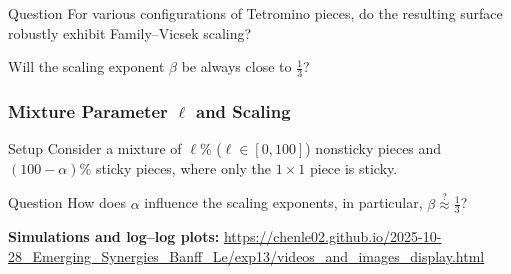 \documentclass[9pt,table,xcolor=dvipsnames]{beamer}
\begin{document}
\begin{frame}[fragile,t] %

  \begin{problock}{Question}
    For various configurations of Tetromino pieces, do the resulting surface
    robustly exhibit Family--Vicsek scaling?

    Will the scaling exponent $\beta$ be always close to $ \displaystyle \frac{1}{3}$?
  \end{problock}
  
\end{frame}
\begin{frame}[fragile] %
  \frametitle{Mixture Parameter $\ell$ and Scaling}

  \begin{assblock}{Setup}
    Consider a mixture of $\ell\%$ ($\ell \in [0, 100]$) nonsticky pieces and
    $(100{-}\alpha)\%$ sticky pieces, where only the $1\times1$ piece is sticky.
  \end{assblock}

  \begin{problock}{Question}
    How does $\alpha$ influence the scaling exponents, in particular, $ \displaystyle \beta \stackrel{?}{\approx} \frac{1}{3}$?
  \end{problock}

  \vspace{0.5em}
  {\small
    \textbf{Simulations and log--log plots:}\newline
    \url{https://chenle02.github.io/2025-10-28_Emerging_Synergies_Banff_Le/exp13/videos_and_images_display.html}
  }
\end{frame}
\end{document}
